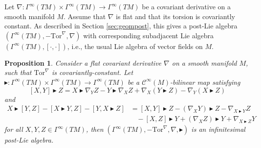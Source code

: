 \documentclass[10pt]{article}
\newtheorem {proposition} [lemma] {Proposition}
\theoremstyle{definition}
\newcommand{\bt}{\blacktriangleright}
\begin{document}
Let $\nabla\colon\Gamma^\infty(TM)\times\Gamma^\infty(TM)\to\Gamma^\infty(TM)$ be a covariant derivative on a smooth manifold $M$. Assume that $\nabla$ is flat and that its torsion is covariantly constant. As described in Section \ref{sec:geompost}, this gives a post-Lie algebra $(\Gamma^\infty(TM),-\mathrm{Tor}^\nabla,\nabla)$ with corresponding subadjacent Lie algebra $(\Gamma^\infty(TM),[\cdot,\cdot])$, i.e., the usual Lie algebra of vector fields on $M$.
\begin{proposition}
Consider a flat covariant derivative $\nabla$ on a smooth manifold $M$, such that $\mathrm{Tor}^\nabla$ is covariantly-constant. Let $\bt\colon\Gamma^\infty(TM)\times\Gamma^\infty(TM)\to\Gamma^\infty(TM)$ be a $\mathscr{C}^\infty(M)$-bilinear map satisfying
\begin{equation}\label{eq:infcon1}
    [X,Y]\bt Z
    =X\bt\nabla_YZ-Y\bt\nabla_XZ+\nabla_X(Y\bt Z)-\nabla_Y(X\bt Z)
\end{equation}
and
\begin{equation}\label{eq:infcon2}
\begin{split}
    X\bt[Y,Z]-[X\bt Y,Z]-[Y,X\bt Z]
    &=[X,Y]\bt Z-(\nabla_XY)\bt Z-\nabla_{X\bt Y}Z\\
    &~~~~-[X,Z]\bt Y+(\nabla_XZ)\bt Y+\nabla_{X\bt Z}Y
\end{split}
\end{equation}
for all $X,Y,Z\in\Gamma^\infty(TM)$, then $(\Gamma^\infty(TM),-\mathrm{Tor}^\nabla,\nabla,\bt)$ is an infinitesimal post-Lie algebra.
\end{proposition}
\end{document}
